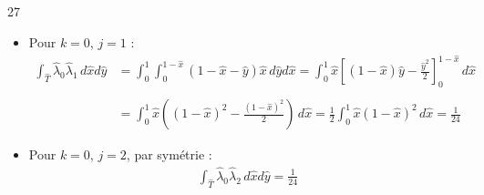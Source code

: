 \begin{reponse}{27}
\begin{itemize}
\begin{align*}
            &= \frac{1}{2} \int_0^1 (\hat{x} - 2\hat{x}^2 + \hat{x}^3) \, ddd\hat{x} = \frac{1}{2} \left( \frac{1}{2} - \frac{2}{3} + \frac{1}{4} \right) = \frac{1}{24}
        \end{align*}
    \item Pour $k=0$, $j=1$ :
        \begin{align*}
            \int_{\hat{T}} \hat{\lambda}_0 \hat{\lambda}_1  \, d\hat{x}d\hat{y} &= \int_0^1 \int_0^{1-\hat{x}} (1 - \hat{x} - \hat{y})\hat{x} \, d\hat{y}d\hat{x} = \int_0^1 \hat{x} \left[ (1-\hat{x})\hat{y} - \frac{\hat{y}^2}{2} \right]_0^{1-\hat{x}} \, d\hat{x} \\ \\
            &= \int_0^1 \hat{x} \left( (1-\hat{x})^2 - \frac{(1-\hat{x})^2}{2} \right) \, d\hat{x} = \frac{1}{2} \int_0^1 \hat{x}(1-\hat{x})^2 \, d\hat{x} = \frac{1}{24}
        \end{align*}
    \item Pour $k=0$, $j=2$, par symétrie :
        \begin{align*}
            \int_{\hat{T}} \hat{\lambda}_0 \hat{\lambda}_2 \, d\hat{x}d\hat{y} = \frac{1}{24}
        \end{align*}
\end{itemize}


\end{reponse}


